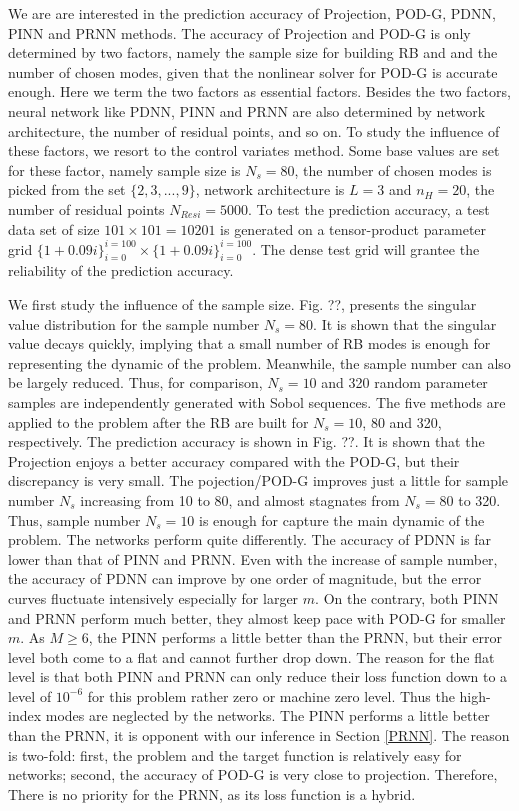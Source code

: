 \documentclass[preprint, 10pt]{elsarticle}
\begin{document}
We are are interested in the prediction accuracy of   Projection, POD-G, PDNN, PINN and PRNN methods. The accuracy of Projection and POD-G is only determined by two factors, namely the sample size for building RB and and the number of chosen modes, given that the nonlinear solver for POD-G is accurate enough. Here we term the two factors as essential factors.
Besides the two factors, neural network like PDNN, PINN and PRNN are also determined by network architecture, the number of residual points, and so on. To study the influence of these factors, we resort to the control variates method. Some base values are set for these factor, namely sample size is $N_s=80$, the number of chosen modes is picked from the set $\{2,3,...,9\}$,  network architecture is $L=3$ and $n_H=20$, the number of residual points $N_{Resi}=5000$. To test the prediction accuracy, a test data set of size $101 \times 101=10201$ is generated on a tensor-product parameter grid $\{1+ 0.09i\}_{i=0}^{i=100} \times \{1+ 0.09i\}_{i=0}^{i=100}$. The dense test grid will grantee the reliability of the prediction accuracy.

We first study the influence of the sample size. Fig. ??, presents the singular value distribution for the sample number $N_s=80$. It is shown that the singular value decays quickly, implying that  a small number of RB modes is enough for representing the dynamic of the problem. Meanwhile, the sample number can also be largely reduced. Thus, for comparison, $N_{s}=10$ and 320 random parameter samples are independently generated with Sobol sequences. The five methods are applied to the problem after the RB are built for $N_{s}=10$, 80 and 320, respectively. The prediction accuracy is shown in Fig. ??. It is shown that the Projection enjoys a better accuracy compared with the POD-G, but their discrepancy is very small. The pojection/POD-G improves just a little for sample number $N_s$ increasing from 10 to 80, and almost stagnates from $N_s=80$ to 320. Thus, sample number $N_s=10$ is enough for capture the main dynamic of the problem. The networks perform quite differently. The accuracy of PDNN is far lower than that of PINN and PRNN. Even with the increase of sample number, the accuracy of PDNN can improve by one order of magnitude, but the error curves fluctuate intensively especially for larger $m$. On the contrary, both PINN and PRNN perform much better, they almost keep pace with POD-G for smaller $m$. As $M \ge 6$, the PINN performs a little better than the PRNN, but their error level both come to a flat and cannot further drop down. The reason for the flat level is that both PINN and PRNN can only reduce their loss function down to a level of $10^{-6}$ for this problem rather zero or machine zero level. Thus the high-index modes are neglected by the networks.  The PINN performs a little better than the PRNN, it is opponent with our inference in Section \ref{PRNN}. The reason is two-fold: first, the problem and the target function is relatively easy for networks; second, the accuracy of POD-G is very close to projection. Therefore, There is no priority for the PRNN, as its loss function is a hybrid.
\end{document}
